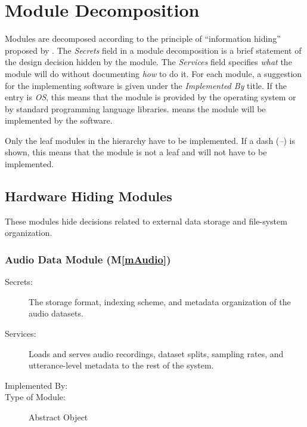 \documentclass[12pt, titlepage]{article}
\newcommand{\mref}[1]{M\ref{#1}}
\begin{document}






\section{Module Decomposition} \label{SecMD}

Modules are decomposed according to the principle of ``information hiding''
proposed by \citet{ParnasEtAl1984}. The \emph{Secrets} field in a module
decomposition is a brief statement of the design decision hidden by the
module. The \emph{Services} field specifies \emph{what} the module will do
without documenting \emph{how} to do it. For each module, a suggestion for the implementing software is given under the \emph{Implemented By} title. If the entry is \emph{OS}, this means that the module is provided by the operating system or by standard programming language libraries.  \emph{\progname{}} means the module will be implemented by the \progname{} software.

Only the leaf modules in the hierarchy have to be implemented. If a dash
(\emph{--}) is shown, this means that the module is not a leaf and will not have to be implemented.





\subsection{Hardware Hiding Modules}

These modules hide decisions related to external data storage and file-system organization.

\subsubsection{Audio Data Module (\mref{mAudio})}

\begin{description}
\item[Secrets:] The storage format, indexing scheme, and metadata organization of the audio datasets.
\item[Services:] Loads and serves audio recordings, dataset splits, sampling rates, and utterance-level metadata to the rest of the system.
\item[Implemented By:] \progname{} \item[Type of Module:] Abstract Object
\end{description}
\end{document}
